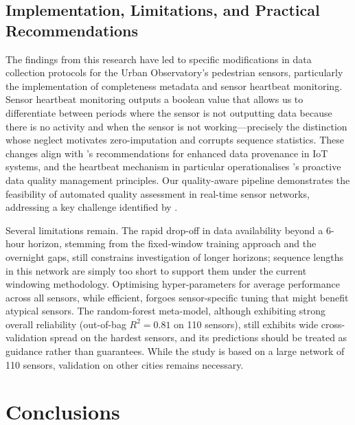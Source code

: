 \documentclass[journal,sensors,submit,pdftex,moreauthors]{Definitions/mdpi}
\begin{document}
\subsection{Implementation, Limitations, and Practical Recommendations}

The findings from this research have led to specific modifications in data collection protocols for the Urban Observatory's pedestrian sensors, particularly the implementation of completeness metadata and sensor heartbeat monitoring. Sensor heartbeat monitoring outputs a boolean value that allows us to differentiate between periods where the sensor is not outputting data because there is no activity and when the sensor is not working---precisely the distinction whose neglect motivates zero-imputation and corrupts sequence statistics. These changes align with \cite{elkhodrDataProvenanceTrust2020}'s recommendations for enhanced data provenance in IoT systems, and the heartbeat mechanism in particular operationalises \cite{chengDataQualityAnalysis2018}'s proactive data quality management principles. Our quality-aware pipeline demonstrates the feasibility of automated quality assessment in real-time sensor networks, addressing a key challenge identified by \cite{sarrabDevelopmentIoTBased2020}.

Several limitations remain. The rapid drop-off in data availability beyond a 6-hour horizon, stemming from the fixed-window training approach and the overnight gaps, still constrains investigation of longer horizons; sequence lengths in this network are simply too short to support them under the current windowing methodology. Optimising hyper-parameters for average performance across all sensors, while efficient, forgoes sensor-specific tuning that might benefit atypical sensors. The random-forest meta-model, although exhibiting strong overall reliability (out-of-bag $R^2 = 0.81$ on 110 sensors), still exhibits wide cross-validation spread on the hardest sensors, and its predictions should be treated as guidance rather than guarantees. While the study is based on a large network of 110 sensors, validation on other cities remains necessary.

\section{Conclusions}
\end{document}
